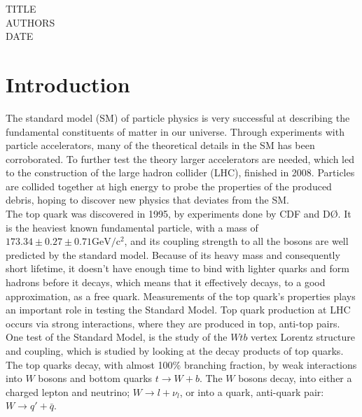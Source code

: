 \documentclass[12pt,a4paper]{article}
\begin{document}
TITLE\\
AUTHORS\\
DATE

\cleardoublepage{}
\begin{abstract}
  
\end{abstract}
\cleardoublepage{}
\tableofcontents{}
\cleardoublepage{}
\section{Introduction}
The standard model (SM) of particle physics is very successful at describing the
fundamental constituents of matter in our universe. Through experiments with
particle accelerators, many of the theoretical details in the SM has been
corroborated. To further test the theory larger accelerators are needed, which
led to the construction of the large hadron collider (LHC), finished in 2008.
Particles are collided together at high energy to probe the properties of the
produced debris, hoping to discover new physics that deviates from the SM.\\

The top quark was discovered in 1995, by experiments done by CDF\cite{Abe_1995}
and DØ\cite{Abachi_1995}. It is the heaviest known fundamental particle, with a
mass of $173.34 \pm 0.27 \pm 0.71 \mathrm{GeV/c^2}$, and its coupling strength
to all the bosons are well predicted by the standard model. Because of its heavy
mass and consequently short lifetime, it doesn't have enough time to bind with
lighter quarks and form hadrons before it decays, which means that it
effectively decays, to a good approximation, as a free quark. Measurements of
the top quark's properties plays an important role in testing the Standard
Model. Top quark production at LHC occurs via strong interactions, where they
are produced in top, anti-top pairs. One test of the Standard Model, is the
study of the $Wtb$ vertex Lorentz structure and coupling, which is studied by
looking at the decay products of top quarks. The top quarks decay, with almost
100\% branching fraction, by weak interactions into $W$ bosons and bottom quarks
$t \rightarrow W + b$. The $W$ bosons decay, into either a charged lepton
and neutrino; $W \rightarrow l + \nu_l$, or into a quark, anti-quark pair: $W \rightarrow q' + \bar{q}$.\\
\end{document}
